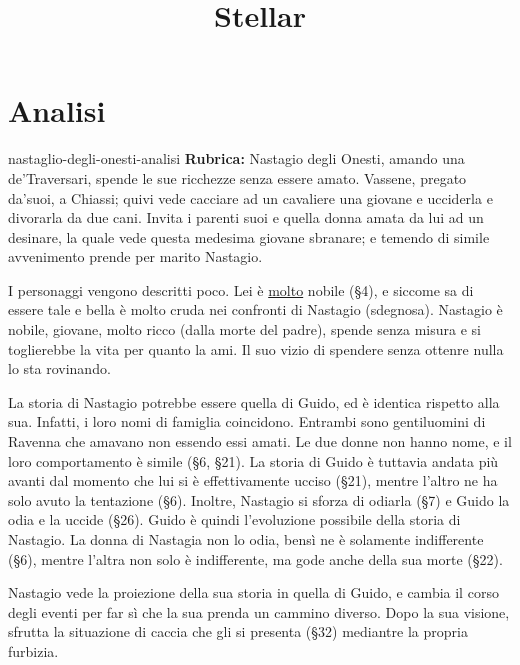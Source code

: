 \documentclass[preview]{standalone}
\begin{document}
\title{Stellar}
\genpage

\section{Analisi}

\begin{snippet}{nastaglio-degli-onesti-analisi}
    \textbf{Rubrica:} Nastagio degli Onesti, amando una de'Traversari,
    spende le sue ricchezze senza essere amato.
    Vassene, pregato da'suoi, a Chiassi; quivi vede cacciare ad un
    cavaliere una giovane e ucciderla e divorarla da due cani.
    Invita i parenti suoi e quella donna amata da lui ad un desinare,
    la quale vede questa medesima giovane sbranare; e temendo di simile avvenimento
    prende per marito Nastagio.
    
    
    I personaggi vengono descritti poco. Lei è \underline{molto} nobile (§4), e siccome sa di essere tale e bella
    è molto cruda nei confronti di Nastagio (sdegnosa). Nastagio è nobile, giovane, molto ricco (dalla morte del padre),
    spende senza misura e si toglierebbe la vita per quanto la ami. Il suo vizio di spendere senza ottenre nulla lo sta rovinando.
    
    La storia di Nastagio potrebbe essere quella di Guido, ed è identica rispetto alla sua.
    Infatti, i loro nomi di famiglia coincidono. Entrambi sono gentiluomini di Ravenna
    che amavano non essendo essi amati.
    Le due donne non hanno nome, e il loro comportamento è simile (§6, §21).
    La storia di Guido è tuttavia andata più avanti dal momento che lui si è effettivamente ucciso (§21), 
    mentre l'altro ne ha solo avuto la tentazione (§6).
    Inoltre, Nastagio si sforza di odiarla (§7) e Guido la odia e la uccide (§26).
    Guido è quindi l'evoluzione possibile della storia di Nastagio.
    La donna di Nastagia non lo odia, bensì ne è solamente indifferente (§6), mentre l'altra
    non solo è indifferente, ma gode anche della sua morte (§22).
    
    Nastagio vede la proiezione della sua storia in quella di Guido, e cambia il corso degli eventi per far sì che
    la sua prenda un cammino diverso.
    Dopo la sua visione, sfrutta la situazione di caccia che gli si presenta (§32) mediantre la propria furbizia.
    

\end{snippet}
\end{document}
